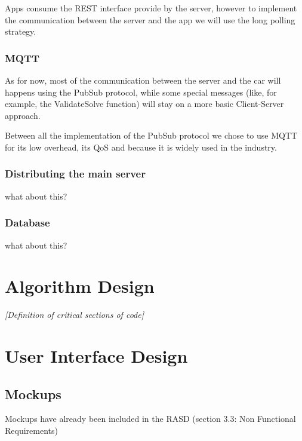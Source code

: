 \documentclass[11pt]{article} %
\begin{document}
Apps consume the REST interface provide by the server, however to implement the communication between the server and the app we will use the long polling strategy.

\subsubsection{MQTT}

As for now, most of the communication between the server and the car will happens using the PubSub protocol, while some special messages (like, for example, the ValidateSolve function) will stay on a more basic Client-Server approach.

 Between all the implementation of the PubSub protocol we chose to use MQTT for its low overhead, its QoS and because it is widely used in the industry.

\subsubsection{Distributing the main server}

{\color{red} {what about this?}}

\subsubsection{Database}

{\color{red} {what about this?}}














\newpage
\section{Algorithm Design}
	\textit{ [Definition of critical sections of code] }


\newpage
\section{User Interface Design}

\subsection{Mockups}
Mockups have already been included in the RASD (section 3.3: Non Functional Requirements) 
\end{document}
